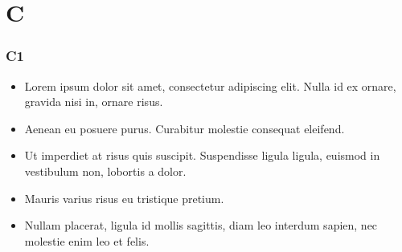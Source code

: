 \documentclass[c]{beamer}
\begin{document}
\section{C}

\begin{frame}

\frametitle{C1}

\begin{itemize}
 \item Lorem ipsum dolor sit amet, consectetur adipiscing elit. Nulla id ex ornare, gravida nisi in, ornare risus. 
 \item Aenean eu posuere purus. Curabitur molestie consequat eleifend. 
 \item Ut imperdiet at risus quis suscipit. Suspendisse ligula ligula, euismod in vestibulum non, lobortis a dolor.
 \item Mauris varius risus eu tristique pretium.
 \item Nullam placerat, ligula id mollis sagittis, diam leo interdum sapien, nec molestie enim leo et felis.
\end{itemize}




\end{frame}


\end{document}
